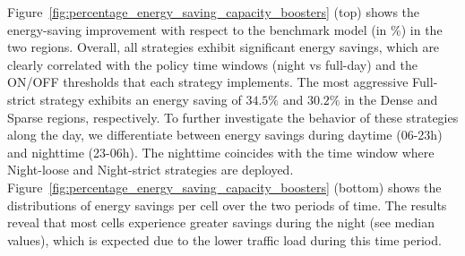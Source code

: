 
Figure~\ref{fig:percentage_energy_saving_capacity_boosters} (top) shows the energy-saving improvement with respect to the benchmark model (in \%) in the two regions. Overall, all strategies exhibit significant energy savings, which are clearly correlated with the policy time windows (night vs full-day) and the ON/OFF thresholds that each strategy implements. The most aggressive Full-strict strategy exhibits an energy saving of $34.5\%$ and $30.2\%$ in the Dense and Sparse regions, respectively. To further investigate the behavior of these strategies along the day, we differentiate between energy savings during daytime (06-23h) and nighttime (23-06h). The nighttime coincides with the time window where Night-loose and Night-strict strategies are deployed. 
Figure~\ref{fig:percentage_energy_saving_capacity_boosters} (bottom) shows the distributions of energy savings per cell over the two periods of time. The results reveal that most cells experience greater savings during the night (see median values), which is expected due to the lower traffic load during this time period.

